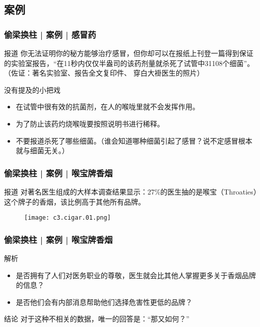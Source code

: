 \subsection{案例}
\begin{frame}
  \frametitle{偷梁换柱 | 案例 | 感冒药}
  \begin{block}{报道}
    你无法证明你的秘方能够治疗感冒，但你却可以在报纸上刊登一篇得到保证的实验室报告，“在11秒内仅仅半盎司的该药剂量就杀死了试管中31108个细菌”。（佐证：著名实验室、报告全文复印件、 穿白大褂医生的照片）
  \end{block}
  \pause
  \begin{block}{没有提及的小把戏}
    \begin{itemize}
      \item 在试管中很有效的抗菌剂，在人的喉咙里就不会发挥作用。
      \item 为了防止该药灼烧喉咙要按照说明书进行稀释。
      \item 不要报道杀死了哪些细菌。（谁会知道哪种细菌引起了感冒？说不定感冒根本就与细菌无关。）
    \end{itemize}
  \end{block}
\end{frame}

\begin{frame}
  \frametitle{偷梁换柱 | 案例 | 喉宝牌香烟}
  \begin{block}{报道}
    对著名医生组成的大样本调查结果显示：27\%的医生抽的是喉宝（Throaties）这个牌子的香烟，该比例高于其他所有品牌。
  \end{block}
  \begin{figure}
    \centering
    \texttt{[image: c3.cigar.01.png]}
  \end{figure}
\end{frame}

\begin{frame}
  \frametitle{偷梁换柱 | 案例 | 喉宝牌香烟}
  \begin{block}{解析}
    \begin{itemize}
      \item 是否拥有了人们对医务职业的尊敬，医生就会比其他人掌握更多关于香烟品牌的信息？
      \item 是否他们会有内部消息帮助他们选择危害性更低的品牌？
    \end{itemize}
  \end{block}
  \pause
  \begin{block}{结论}
    对于这种不相关的数据，唯一的回答是：“那又如何？”
  \end{block}
\end{frame}


